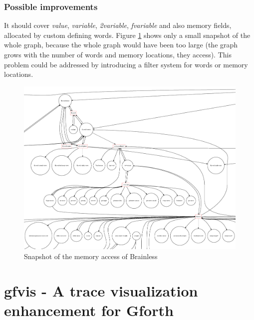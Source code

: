\subsubsection*{Possible improvements}

It should cover \emph{value}, \emph{variable}, \emph{2variable}, \emph{fvariable} and also memory fields, allocated by custom defining words. Figure \ref{fig:taxonomy} shows only a small snapshot of the whole graph, because the whole graph would have been too large (the graph grows with the number of words and memory locations, they access). This problem could be addressed by introducing a filter system for words or memory locations.

\begin{figure}[p]
    \centering
    \includegraphics[scale=0.20]{graphics/taxonomy_view2.png}
    \caption{Snapshot of the memory access of Brainless}
    \label{fig:taxonomy}
\end{figure}

\section{gfvis - A trace visualization enhancement for Gforth}

